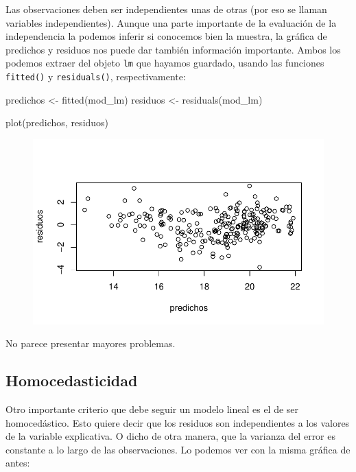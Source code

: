 \documentclass[
  letterpaper,
  DIV=11,
  numbers=noendperiod]{scrreprt}
\newenvironment{Shaded}{\begin{snugshade}}{\end{snugshade}}
\newcommand{\FunctionTok}[1]{\textcolor[rgb]{0.28,0.35,0.67}{#1}}
\newcommand{\NormalTok}[1]{\textcolor[rgb]{0.00,0.23,0.31}{#1}}
\newcommand{\OtherTok}[1]{\textcolor[rgb]{0.00,0.23,0.31}{#1}}
\begin{document}
Las observaciones deben ser independientes unas de otras (por eso se
llaman variables independientes). Aunque una parte importante de la
evaluación de la independencia la podemos inferir si conocemos bien la
muestra, la gráfica de predichos y residuos nos puede dar también
información importante. Ambos los podemos extraer del objeto \texttt{lm}
que hayamos guardado, usando las funciones \texttt{fitted()} y
\texttt{residuals()}, respectivamente:

\begin{Shaded}
\begin{Highlighting}[]
\NormalTok{predichos }\OtherTok{\textless{}{-}} \FunctionTok{fitted}\NormalTok{(mod\_lm)}
\NormalTok{residuos }\OtherTok{\textless{}{-}} \FunctionTok{residuals}\NormalTok{(mod\_lm)}

\FunctionTok{plot}\NormalTok{(predichos, residuos)}
\end{Highlighting}
\end{Shaded}

\begin{figure}[H]

{\centering \includegraphics{01_RegresionLineal_files/figure-pdf/unnamed-chunk-30-1.pdf}

}

\end{figure}

No parece presentar mayores problemas.

\hypertarget{homocedasticidad}{%
\subsection{Homocedasticidad}\label{homocedasticidad}}

Otro importante criterio que debe seguir un modelo lineal es el de ser
homocedástico. Esto quiere decir que los residuos son independientes a
los valores de la variable explicativa. O dicho de otra manera, que la
varianza del error es constante a lo largo de las observaciones. Lo
podemos ver con la misma gráfica de antes:
\end{document}
